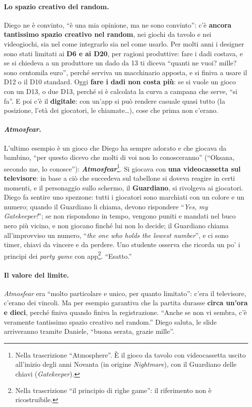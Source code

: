 \paragraph{Lo spazio creativo del random.} Diego ne è convinto, ``è una mia opinione, ma ne
sono convinto'': c'è \textbf{ancora tantissimo spazio creativo nel random}, nei giochi da
tavolo e nei videogiochi, sia nel come integrarlo sia nel come usarlo. Per molti anni i
designer sono stati limitati ai \textbf{D6 e ai D20}, per ragioni produttive: fare i dadi
costava, e se si chiedeva a un produttore un dado da 13 ti diceva ``quanti ne vuoi? mille? sono
centomila euro'', perché serviva un macchinario apposta, e si finiva a usare il D12 o il D10
standard. Oggi \textbf{fare i dadi non costa più}: se si vuole un gioco con un D13, o due D13,
perché si è calcolata la curva a campana che serve, ``si fa''. E poi c'è il
\textbf{digitale}: con un'app si può rendere casuale quasi tutto (la posizione, l'età dei
giocatori, le chiamate\ldots), cose che prima non c'erano.

\paragraph{\emph{Atmosfear}.} L'ultimo esempio è un gioco che Diego ha sempre adorato e che
giocava da bambino, ``per questo dicevo che molti di voi non lo conosceranno'' (``Oksana, secondo
me, lo conosce''): \textbf{\emph{Atmosfear}}\footnote{Nella trascrizione ``Atmosphere''. È il
gioco da tavolo con videocassetta uscito all'inizio degli anni Novanta (in origine
\emph{Nightmare}), con il Guardiano delle chiavi (\emph{Gatekeeper}).}. Si giocava con
\textbf{una videocassetta sul televisore}: in base a ciò che succedeva sul tabellone si doveva
reagire in certi momenti, e il personaggio sullo schermo, il \textbf{Guardiano}, si rivolgeva
ai giocatori. Diego fa sentire uno spezzone: tutti i giocatori sono marchiati con un colore e
un numero; quando il Guardiano li chiama, devono rispondere ``\emph{Yes, my Gatekeeper!}''; se
non rispondono in tempo, vengono puniti e mandati nel buco nero più vicino, e non giocano
finché lui non lo decide; il Guardiano chiama all'improvviso un numero, ``\emph{the one who
holds the lowest number}'', e ci sono timer, chiavi da vincere e da perdere. Uno studente
osserva che ricorda un po' i principi dei \emph{party game} con app\footnote{Nella trascrizione
``il principio di righe game'': il riferimento non è ricostruibile.}. ``Esatto.''

\paragraph{Il valore del limite.} \emph{Atmosfear} era ``molto particolare e unico, per quanto
limitato'': c'era il televisore, c'erano dei vincoli. Ma per esempio garantiva che la partita
durasse \textbf{circa un'ora e dieci}, perché finiva quando finiva la registrazione. ``Anche se
non vi sembra, c'è veramente tantissimo spazio creativo nel random.'' Diego saluta, le slide
arriveranno tramite Daniele, ``buona serata, grazie mille''.

